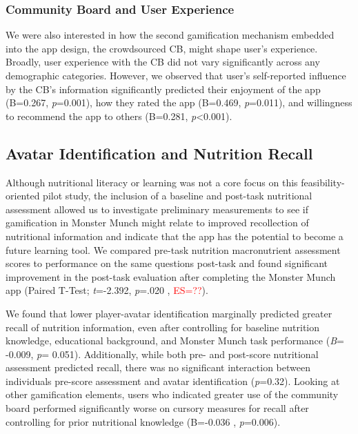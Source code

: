 \vspace{-5pt}
\subsubsection {Community Board and User Experience}
We were also interested in how the second gamification mechanism embedded into the app design, the crowdsourced CB, might shape user's experience.
Broadly, user experience with the CB did not vary significantly across any demographic categories. However, we observed that user's self-reported influence by the CB's information significantly predicted their enjoyment of the app (B=0.267, \textit{p}=0.001), how they rated the app (B=0.469, \textit{p}=0.011), and willingness to recommend the app to others (B=0.281, \textit{p}<0.001).

\vspace{-5pt}
\subsection{Avatar Identification and  Nutrition Recall}

Although nutritional literacy or learning was not a core focus on this feasibility-oriented pilot study, the inclusion of a baseline and post-task nutritional assessment allowed us to investigate preliminary measurements to see if gamification in Monster Munch might relate to improved recollection of nutritional information and indicate that the app has the potential to become a future learning tool. We compared pre-task nutrition macronutrient assessment scores to performance on the same questions post-task and found significant improvement in the post-task evaluation after completing the Monster Munch app (Paired T-Test; \textit{t}=-2.392, \textit{p}=.020 , \textcolor{red}{ES=??}).

We found that lower player-avatar identification marginally predicted greater recall of nutrition information, even after controlling for baseline nutrition knowledge, educational background, and Monster Munch task performance (\textit{B}= -0.009, \textit{p}= 0.051). Additionally, while both pre- and post-score nutritional assessment  predicted recall, there was no significant interaction between individuals pre-score assessment and avatar identification (\textit{p}=0.32). 
Looking at other gamification elements, users who indicated greater use of the community board performed significantly worse on cursory measures for recall after controlling for prior nutritional knowledge (B=-0.036 , \textit{p}=0.006).



